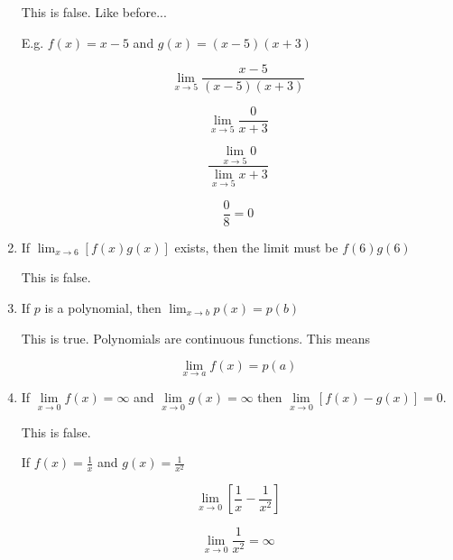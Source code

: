 \documentclass{article}
\begin{document}
\begin{enumerate}
		This is false. Like before...

		E.g. $f(x) = x - 5$ and $g(x) = (x-5)(x+3)$

		$$\lim \limits _{x \to 5} \frac{x-5}{(x-5)(x+3)}$$

		$$\lim \limits _{x \to 5} \frac{0}{x+3}$$

		$$\frac{ \lim \limits _{x \to 5} 0}{\lim \limits _{x \to 5} x + 3}$$

		$$\frac{0}{8} = 0$$

	\item If $\lim _{x \to 6} [f(x)g(x)]$ exists, then the limit must be $f(6)g(6)$

		This is false.

	\item If $p$ is a polynomial, then $\lim _{x \to b} p(x) = p(b)$

		This is true. Polynomials are continuous functions. This means

		$$\lim \limits _{x \to a} f(x) = p(a)$$

	\item If $\lim \limits _{x \to 0} f(x) = \infty$ and $\lim \limits _{x \to 0} g(x) = \infty$
		then $\lim \limits _{x \to 0} [f(x) - g(x)] = 0$.

		This is false.

		If $f(x) = \frac{1}{x}$ and $g(x) = \frac{1}{x^2}$

		$$\lim \limits _{x \to 0} [\frac{1}{x} - \frac{1}{x^2}]$$

		$$\lim \limits _{x \to 0} \frac{1}{x^2} = \infty$$
\end{enumerate}
\end{document}
